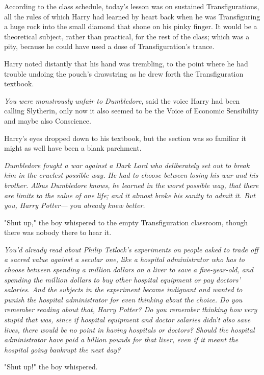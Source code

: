 According to the class schedule, today's lesson was on sustained
Transfigurations, all the rules of which Harry had learned by heart back when
he was Transfiguring a huge rock into the small diamond that shone on his pinky
finger. It would be a theoretical subject, rather than practical, for the rest
of the class; which was a pity, because he could have used a dose of
Transfiguration's trance.

Harry noted distantly that his hand was trembling, to the point where he had
trouble undoing the pouch's drawstring as he drew forth the Transfiguration
textbook.

\emph{You were monstrously unfair to Dumbledore,} said the voice Harry had been
calling Slytherin, only now it also seemed to be the Voice of Economic
Sensibility and maybe also Conscience.

Harry's eyes dropped down to his textbook, but the section was so familiar it
might as well have been a blank parchment.

\emph{Dumbledore fought a war against a Dark Lord who deliberately set out to
break him in the cruelest possible way. He had to choose between losing his war
and his brother. Albus Dumbledore knows, he learned in the worst possible way,
that there are limits to the value of one life; and it almost broke his sanity
to admit it. But you, Harry Potter---} you \emph{already knew better.}

"Shut up," the boy whispered to the empty Transfiguration classroom, though
there was nobody there to hear it.

\emph{You'd already read about Philip Tetlock's experiments on people asked to
trade off a sacred value against a secular one, like a hospital administrator
who has to choose between spending a million dollars on a liver to save a
five-year-old, and spending the million dollars to buy other hospital equipment
or pay doctors' salaries. And the subjects in the experiment became indignant
and wanted to punish the hospital administrator for even thinking about the
choice. Do you remember reading about that, Harry Potter? Do you remember
thinking how very stupid that was, since if hospital equipment and doctor
salaries didn't also save lives, there would be no point in having hospitals or
doctors? Should the hospital administrator have paid a billion pounds for that
liver, even if it meant the hospital going bankrupt the next day?}

"Shut up!" the boy whispered.


